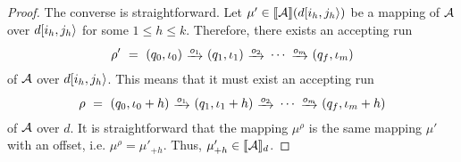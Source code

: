 \begin{proof}
    The converse is straightforward. Let $\mu' \in \llbracket\mathcal{A}\rrbracket(d[i_h, j_h\rangle)$
    be a mapping of $\mathcal{A}$ over $d[i_h, j_h\rangle$ for some $1 \leq h \leq k$.
    Therefore, there exists an accepting run
    $$
    \rho' \ = \ (q_0, \iota_0) \ \trans{o_1} \ (q_1, \iota_1) \ \trans{o_2} \ \cdots \ \trans{o_m} \ (q_f, \iota_m)
    $$
    of $\mathcal{A}$ over $d[i_h, j_h\rangle$. This means that it must exist an
    accepting run
    $$
    \rho \ = \ (q_0, \iota_0+h) \ \trans{o_1} \ (q_1, \iota_1+h) \ \trans{o_2} \ \cdots \ \trans{o_m} \ (q_f, \iota_m+h)
    $$
    of $\mathcal{A}$ over $d$. It is straightforward that the mapping $\mu^\rho$ is the
    same mapping $\mu'$ with an offset, i.e. $\mu^\rho = \mu'_{+h}$. Thus,
    $\mu'_{+h} \in \llbracket\mathcal{A}\rrbracket_d$. \qedhere 
    

\end{proof}